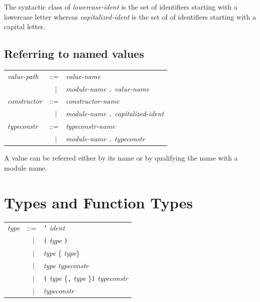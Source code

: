 \documentclass[11pt,titlepage,twoside]{report}
\newcommand{\alt}{\;|\;}
\newcommand{\term}[1]{{\tt #1}}
\newcommand{\nterm}[1]{{\em #1}}
\begin{document}
The syntactic class of \nterm{lowercase-ident} is the
set of identifiers starting with a lowercase letter whereas
\nterm{capitalized-ident} is the set of of identifiers starting with a
capital letter.

\subsection{Referring to named values}
\begin{center}
\begin{tabular}{lcl}
\nterm{value-path}  & ::=        & \nterm{value-name} \\
                    & $\;\;\alt$ & \nterm{module-name} \term{.}
                                   \nterm{value-name} \\
\nterm{constructor} & ::=        & \nterm{constructor-name} \\
                    & $\;\;\alt$ & \nterm{module-name} \term{.}
                                   \nterm{capitalized-ident} \\
\nterm{typeconstr}  & ::=        & \nterm{typeconstr-name} \\
                    & $\;\;\alt$ & \nterm{module-name} \term{.} 
                                   \nterm{typeconstr}
\end{tabular}
\end{center}
A value can be referred either by its name or by qualifying the name
with a module name.

\section{Types and Function Types}
\begin{center}
\begin{tabular}{lcl}
\nterm{type} & ::=        & \term{'} \nterm{ident} \\
             & $\;\;\alt$ & \term{(} \nterm{type} \term{)} \\
             & $\;\;\alt$ & \nterm{type} \{\term{*} \nterm{type}\} \\
             & $\;\;\alt$ & \nterm{type} \nterm{typeconstr} \\
             & $\;\;\alt$ & \term{(} \nterm{type} \{\term{,}
                            \nterm{type} \}\term{)} \nterm{typeconstr} \\
             & $\;\;\alt$ & \nterm{typeconstr}
\end{tabular}
\end{center}
\end{document}
